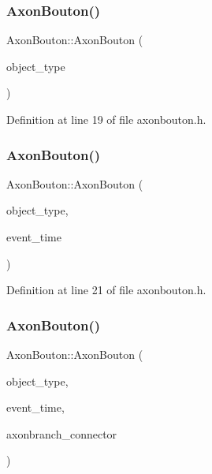 \subsubsection{\texorpdfstring{Axon\+Bouton()}{AxonBouton()}\hspace{0.1cm}{\footnotesize\ttfamily [2/4]}}
{\footnotesize\ttfamily Axon\+Bouton\+::\+Axon\+Bouton (\begin{DoxyParamCaption}\item[{unsigned int}]{object\+\_\+type }\end{DoxyParamCaption})\hspace{0.3cm}{\ttfamily [inline]}}



Definition at line 19 of file axonbouton.\+h.

\mbox{\label{class_axon_bouton_a93e33d72d90801d29d2b16ef94b59fab}} 
\subsubsection{\texorpdfstring{Axon\+Bouton()}{AxonBouton()}\hspace{0.1cm}{\footnotesize\ttfamily [3/4]}}
{\footnotesize\ttfamily Axon\+Bouton\+::\+Axon\+Bouton (\begin{DoxyParamCaption}\item[{unsigned int}]{object\+\_\+type,  }\item[{std\+::chrono\+::time\+\_\+point$<$ \hyperlink{universe_8h_a0ef8d951d1ca5ab3cfaf7ab4c7a6fd80}{Clock} $>$}]{event\+\_\+time }\end{DoxyParamCaption})\hspace{0.3cm}{\ttfamily [inline]}}



Definition at line 21 of file axonbouton.\+h.

\mbox{\label{class_axon_bouton_a6d671fc3b6bd8e617085c1bc7212400d}} 
\subsubsection{\texorpdfstring{Axon\+Bouton()}{AxonBouton()}\hspace{0.1cm}{\footnotesize\ttfamily [4/4]}}
{\footnotesize\ttfamily Axon\+Bouton\+::\+Axon\+Bouton (\begin{DoxyParamCaption}\item[{unsigned int}]{object\+\_\+type,  }\item[{std\+::chrono\+::time\+\_\+point$<$ \hyperlink{universe_8h_a0ef8d951d1ca5ab3cfaf7ab4c7a6fd80}{Clock} $>$}]{event\+\_\+time,  }\item[{\hyperlink{class_axon_branch}{Axon\+Branch} \&}]{axonbranch\+\_\+connector }\end{DoxyParamCaption})\hspace{0.3cm}{\ttfamily [inline]}}



